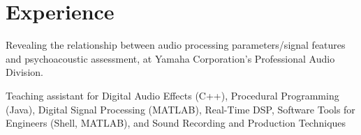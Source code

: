 \documentclass[letterpaper]{deedy-resume} %
\begin{document}
{\begin{minipage}[t]{0.33\textwidth}
\end{minipage} %
\hfill
%
%
\begin{minipage}[t]{0.66\textwidth} %


\section{Experience}

\hspace{-0.1cm}
\vspace{\topsep} %
\begin{tightitemize}
\item Revealing the relationship between audio processing parameters/signal features and psychoacoustic assessment, at Yamaha Corporation's Professional Audio Division. 
\end{tightitemize}


\hspace{-0.1cm}
\begin{tightitemize}
\item Teaching assistant for Digital Audio Effects (C++), Procedural Programming (Java), Digital Signal Processing (MATLAB), Real-Time DSP, Software Tools for Engineers (Shell, MATLAB), and Sound Recording and Production Techniques
\end{tightitemize}


\end{minipage}}
\end{document}
